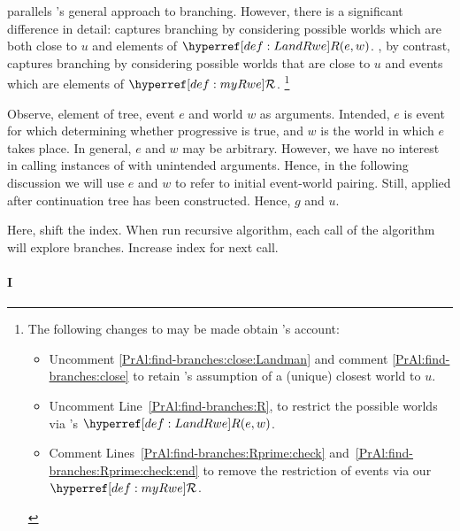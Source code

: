\begin{note}
  \AlgFindBranches{} parallels \citeauthor{Landman:1992wh}'s general approach to branching.
  However, there is a significant difference in detail:
  \citeauthor{Landman:1992wh} captures branching by considering possible worlds which are both close to \(u\) and elements of \(\lRwe{w}{e}\).
  \AlgFindBranches{}, by contrast, captures branching by considering possible worlds that are close to \(u\) and events which are elements of \(\mRweSym{}\).%
  \footnote{
    \label{fn:Alg:branches:getLandman}
    The following changes to \AlgFindBranches{} may be made obtain \citeauthor{Landman:1992wh}'s account:
    \begin{itemize}[noitemsep]
    \item
      Uncomment \autoref{PrAl:find-branches:close:Landman} and comment \autoref{PrAl:find-branches:close} to retain \citeauthor{Landman:1992wh}'s assumption of a (unique) closest world to \(u\).
    \item
      Uncomment Line~\ref{PrAl:find-branches:R}, to restrict the possible worlds via \citeauthor{Landman:1992wh}'s \(\lRwe{w}{e}\).
    \item
      Comment Lines~\ref{PrAl:find-branches:Rprime:check} and~\ref{PrAl:find-branches:Rprime:check:end} to remove the restriction of events via our \(\mRweSym{}\).
    \end{itemize}
    \vspace{-\baselineskip}
  }
\end{note}

\begin{note}
  Observe, element of tree, event \(e\) and world \(w\) as arguments.
  Intended, \(e\) is event for which determining whether progressive is true, and \(w\) is the world in which \(e\) takes place.
  In general, \(e\) and \(w\) may be arbitrary.
  However, we have no interest in calling instances of \AlgFindBranches{} with unintended arguments.
  Hence, in the following discussion we will use \(e\) and \(w\) to refer to initial event-world pairing.
  Still, \AlgFindBranches{} applied after continuation tree has been constructed.
  Hence, \(g\) and \(u\).
\end{note}

\begin{note}
  Here, shift the index.
  When run recursive algorithm, each call of the algorithm will explore branches.
  Increase index for next call.
\end{note}

\paragraph{ I}
\label{cha:fcs:sec:Prog:L:Alg:branches:role}

